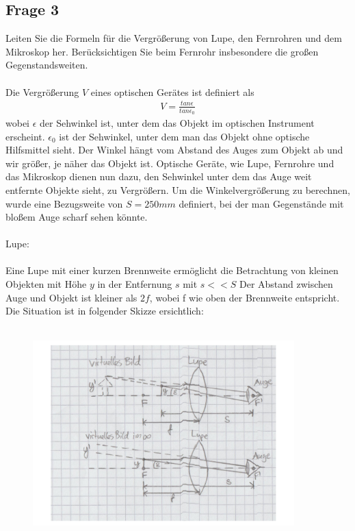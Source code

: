 \documentclass[a4paper,10pt]{scrartcl}
\begin{document}
		\subsection{Frage 3}
			Leiten Sie die Formeln für die Vergrößerung von Lupe, den Fernrohren und dem Mikroskop
			her. Berücksichtigen Sie beim Fernrohr insbesondere die großen Gegenstandsweiten.\\
			\\
			Die Vergrößerung \(V\) eines optischen Gerätes ist definiert als
			\begin{align*}
			V=\frac{tan\epsilon}{tan\epsilon_{0}}
			\end{align*}	
			wobei \(\epsilon\) der Sehwinkel ist, unter dem das Objekt im optischen Instrument erscheint. \(\epsilon_{0}\) ist der Sehwinkel, unter dem man das Objekt ohne optische Hilfsmittel sieht. Der Winkel hängt vom Abstand des Auges zum Objekt ab und wir größer, je näher das Objekt ist. Optische Geräte, wie Lupe, Fernrohre und das Mikroskop dienen nun dazu, den Sehwinkel unter dem das Auge weit entfernte Objekte sieht, zu Vergrößern. Um die Winkelvergrößerung zu berechnen, wurde eine Bezugsweite von \(S=250mm\) definiert, bei der man Gegenstände mit bloßem Auge scharf sehen könnte.\\
			\\
			Lupe:\\
			\\
			Eine Lupe mit einer kurzen Brennweite ermöglicht die Betrachtung von kleinen Objekten mit Höhe \(y\) in der Entfernung \(s\) mit \(s<<S\) Der Abstand zwischen Auge und Objekt ist kleiner als \(2f\), wobei f wie oben der Brennweite entspricht. Die Situation ist in folgender Skizze ersichtlich:\\
			\\
				\begin{figure}[h]
\centering
\includegraphics[width=0.9\textwidth]{./Bilder/og4}
\end{figure}
\end{document}
